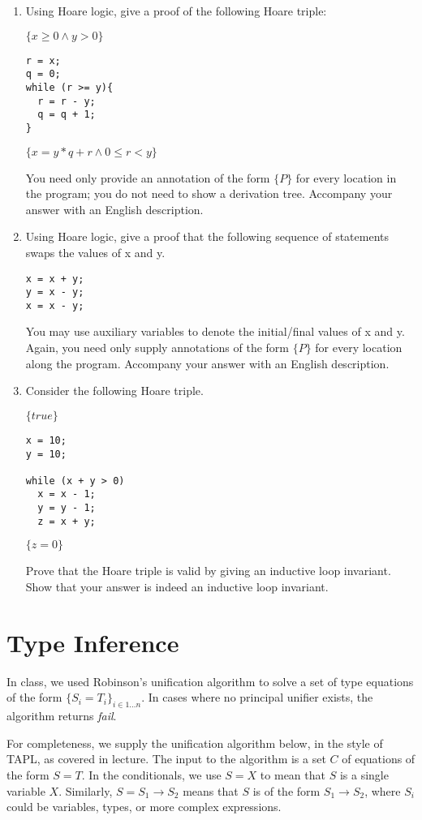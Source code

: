 \documentclass[11pt, oneside]{article}   	%
\begin{document}
\begin{enumerate}[label=\bf\Alph*]
\item
Using Hoare logic, give a proof of the following Hoare triple:

$\{x \geq 0 \land y > 0\}$
\begin{verbatim}
r = x;
q = 0;
while (r >= y){
  r = r - y;
  q = q + 1;
}
\end{verbatim}
$\{x = y * q + r \land 0 \leq r < y\}$

You need only provide an annotation of the form $\{P\}$
for every location in the program; you do not need
to show a derivation tree.
Accompany your answer with an English description.

\item Using Hoare logic, give a proof that the following
sequence of statements swaps the values of x and y.

\begin{verbatim}
x = x + y;
y = x - y;
x = x - y;
\end{verbatim}

You may use auxiliary variables to denote the
initial/final values of x and y.
Again, you need only supply annotations of the form $\{P\}$
for every location along the program.
Accompany your answer with an English description.

\item Consider the following Hoare triple.

$\{true\}$
\begin{verbatim}
x = 10;
y = 10;

while (x + y > 0)
  x = x - 1;
  y = y - 1;
  z = x + y;
\end{verbatim}
$\{z=0\}$


Prove that the Hoare triple is valid
by giving an inductive loop invariant.
Show that your answer is indeed an inductive loop invariant.
\end{enumerate}

\section{Type Inference}
In class, we used Robinson's unification algorithm to
solve a set of type equations of the form $\{S_i = T_i\}_{i\in 1\ldots n}.$
In cases where no principal unifier exists,
the algorithm returns \emph{fail}.




For completeness, we supply the unification algorithm below,
in the style of TAPL, as covered in lecture.
The input to the algorithm is a set $C$ of equations
of the form $S=T$.
In the conditionals, we use
 $S = X$ to mean that $S$ is a single variable $X$.
Similarly, $S = S_1 \to S_2$ means that $S$ is of the form
$S_1 \to S_2$, where $S_i$ could be variables, types,
or more complex expressions.
\end{document}
